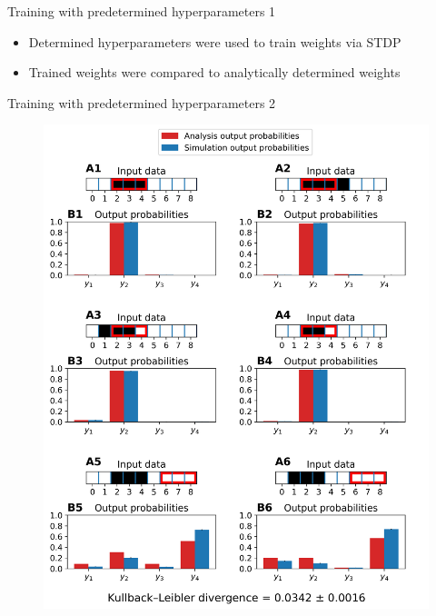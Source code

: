 \documentclass[aspectratio=169]{beamer}
\begin{document}
\begin{frame}{Training with predetermined hyperparameters 1}
  \begin{itemize}
    \item Determined hyperparameters were used to train weights via STDP
    \item Trained weights were compared to analytically determined weights
  \end{itemize}
\end{frame}

\begin{frame}{Training with predetermined hyperparameters 2}
 \vspace{-1.0cm}
		\begin{figure}
        \includegraphics[width=0.35\linewidth]{../Latex/figures/1D/training/trainingEvaluation_98_440_4_c3.png}
      \end{figure} 
\end{frame}
\end{document}
